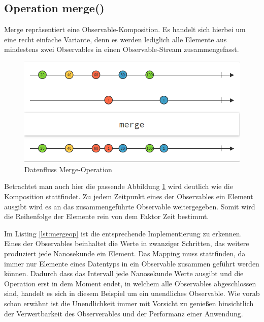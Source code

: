 \subsection{Operation merge()}
Merge repräsentiert eine Observable-Komposition. Es handelt sich hierbei um eine recht einfache Variante, denn es werden lediglich alle Elemente aus mindestens zwei Observables in einen Observable-Stream zusammengefasst. 
\begin{figure}
	\centering
	\includegraphics[width=1\textwidth]{Abb/merge}
	\caption{Datenfluss Merge-Operation}
	\label{pic:merge}
\end{figure}
Betrachtet man auch hier die passende Abbildung \ref{pic:merge} wird deutlich wie die Komposition stattfindet. Zu jedem Zeitpunkt eines der Observables ein Element ausgibt wird es an das zusammengeführte Observable weitergegeben. Somit wird die Reihenfolge der Elemente rein von dem Faktor Zeit bestimmt.
 
Im Listing \ref{lst:mergeop} ist die entsprechende Implementierung zu erkennen. Eines der Observables beinhaltet die Werte in zwanziger Schritten, das weitere produziert jede Nanosekunde ein Element. Das Mapping muss stattfinden, da immer nur Elemente eines Datentyps in ein Observable zusammen geführt werden können. Dadurch dass das Intervall jede Nanosekunde Werte ausgibt und die Operation erst in dem Moment endet, in welchem alle Observables abgeschlossen sind, handelt es sich in diesem Beispiel um ein unendliches Observable. Wie vorab schon erwähnt ist die Unendlichkeit immer mit Vorsicht zu genießen hinsichtlich der Verwertbarkeit des Observerables und der Performanz einer Anwendung.
